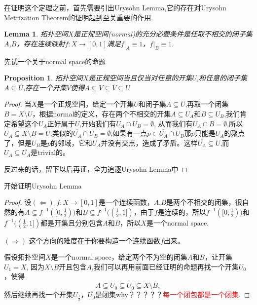 \documentclass{article}
\newtheorem{lemma}[theorem]{Lemma}
\newtheorem{proposition}[theorem]{Proposition}
\newcommand*{\xfunc}[4]{{#2}\colon{#3}{#1}{#4}}
\newcommand*{\func}[3]{\xfunc{\to}{#1}{#2}{#3}}
\begin{document}
在证明这个定理之前，首先需要引出Urysohn Lemma,它的存在对Urysohn Metrization Theorem的证明起到至关重要的作用.

\begin{lemma}
拓扑空间$X$是正规空间(normal)的充分必要条件是任取不相交的闭子集$A$,$B$，存在连续映射$\func{f}{X}{[0,1]}$满足$f|_A \equiv 1$，$f|_B \equiv 1$.
\end{lemma}

先试一个关于normal space的命题
\begin{proposition}
拓扑空间$X$是正规空间当且仅当对任意的开集$U$,和任意的闭子集$A \subseteq U$,存在一个开集$V$使得$A \subseteq V \subseteq \overline{V} \subseteq U$
\end{proposition}

\begin{proof}
当$X$是一个正规空间，给定一个开集$U$和闭子集$A \subseteq U$,再取一个闭集$B = X \setminus U$，根据normal的定义，存在两个不相交的开集$A \subseteq U_A$和$B \subseteq U_B$,我们肯定希望这个$U_A$正好属于$U$,开始我们有$U_A \cap U_B = \emptyset$, 从而我们有$U_A \cap B = \emptyset$,所以$U_A \subseteq X \setminus B = U$,类似的$\overline{U_A} \cap U_B = \emptyset$,如果有一点$p \in \overline{U_A} \cap U_B$那$p$只能是$U_A$的聚点了，但是$U_B$是$p$的邻域，它和$U_A$并没有交点，造成了矛盾。这样$\overline{U_A} \subseteq U$,而$U_A \subseteq \overline{U_A}$是trivial的。

反过来的话，留下以后再证，全力追逐Urysohn Lemma中
\end{proof}

开始证明Urysohn Lemma

\begin{proof}
设$(\Leftarrow)$ $\func{f}{X}{[0,1]}$是一个连续函数，$A$,$B$是两个不相交的闭集，很自然的有$A \subseteq f^{-1}([0,\frac{1}{2}))$和$B \subseteq f^{-1}((\frac{1}{2},1])$，由于$f$是连续的，所以$f^{-1}([0,\frac{1}{2}))$和$f^{-1}((\frac{1}{2},1])$都是开集且分别包含$A$和$B$，所以$X$是一个normal space.

$(\Rightarrow)$ 这个方向的难度在于你要构造一个连续函数$f$出来。

假设拓扑空间$X$是一个normal space，给定两个不为空的闭集$A$和$B$，让开集$U_1 = X$, 因为$X \setminus B$开且包含$A$,我们可以再用前面已经证明的命题再找一个开集$U_0$，使得\[A \subseteq U_0 \subseteq \overline{U_0} \subseteq X \setminus B,\]然后继续再找一个开集$U_{\frac{1}{2}}$，$\overline{U_0}$是闭集why？？？？？\textcolor{red}{每一个闭包都是一个闭集}.
\end{proof}
\end{document}
